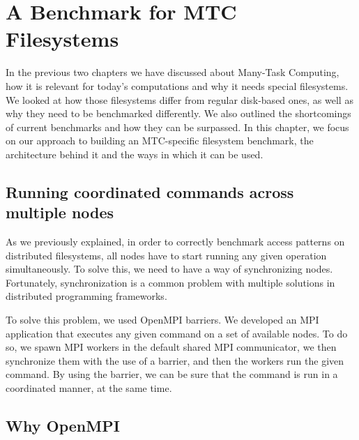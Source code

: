 
\chapter{A Benchmark for MTC Filesystems} %

\label{Chapter3} %


In the previous two chapters we have discussed about Many-Task Computing, how it is relevant for today's  computations and why it needs special filesystems. We looked at how those filesystems differ from regular disk-based ones, as well as why they need to be benchmarked differently. We also outlined the shortcomings of current benchmarks and how they can be surpassed. In this chapter, we focus on our approach to building an MTC-specific filesystem benchmark, the architecture behind it and the ways in which it can be used.

\section{Running coordinated commands across multiple nodes}

As we previously explained, in order to correctly benchmark access patterns on distributed filesystems, all nodes have to start running any given operation simultaneously. To solve this, we need to have a way of synchronizing nodes. Fortunately, synchronization is a common problem with multiple solutions in distributed programming frameworks.

To solve this problem, we used OpenMPI\cite{openmpi} barriers. We developed an MPI application that executes any given command on a set of available nodes. To do so, we spawn MPI workers in the default shared MPI communicator, we then synchronize them with the use of a barrier, and then the workers run the given command. By using the barrier, we can be sure that the command is run in a coordinated manner, at the same time.





\section{Why OpenMPI}

